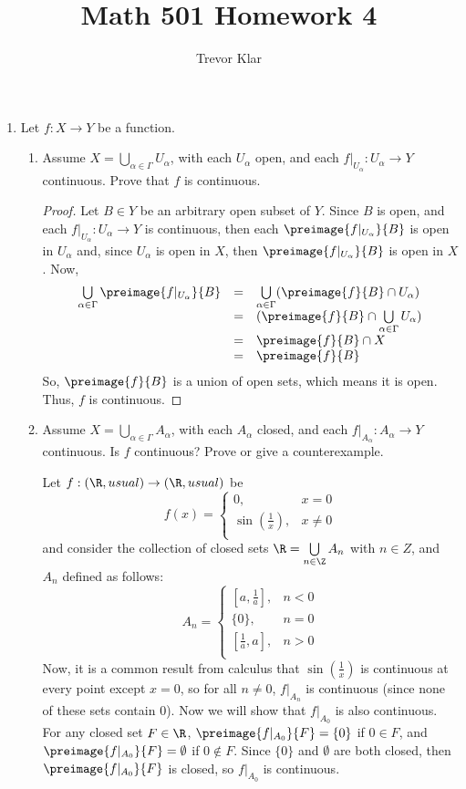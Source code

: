 \documentclass[letterpaper]{article}
\title{Math 501 \linebreak
Homework 4}
\author{Trevor Klar}
\newcommand{\arbcup}[1]{\bigcup\limits_{\alpha\in\Gamma}#1_\alpha}
\begin{document}
\maketitle


\begin{enumerate}
\item Let $f:X\to Y$ be a function. 
	\begin{enumerate}
	\item Assume $X=\arbcup{U}$, with each $U_\alpha$ open, and each $f|_{U_\alpha}:U_\alpha\to Y$ continuous. Prove that $f$ is continuous. 
	\begin{proof}
	Let $B\in Y$ be an arbitrary open subset of $Y$. Since $B$ is open, and each $f|_{U_\alpha}:U_\alpha\to Y$ is continuous, then each $\preimage{f|_{U_\alpha}}{B}$ is open in $U_\alpha$ and, since $U_\alpha$ is open in $X$, then $\preimage{f|_{U_\alpha}}{B}$ is open in $X$. Now, 
	\[
	\begin{array}{rcl}
	\bigcup\limits_{\alpha\in\Gamma}\preimage{f|_{U_\alpha}}{B}&=&\bigcup\limits_{\alpha\in\Gamma}(\preimage{f}{B}\cap U_\alpha)\\
	&=&(\preimage{f}{B}\cap \bigcup\limits_{\alpha\in\Gamma} U_\alpha)\\
	&=&\preimage{f}{B}\cap X\\
	&=&\preimage{f}{B}\\
	
	\end{array}
	\]
	So, $\preimage{f}{B}$ is a union of open sets, which means it is open. Thus, $f$ is continuous.  
	\end{proof}
	\item Assume $X=\arbcup{A}$, with each $A_\alpha$ closed, and each $f|_{A_\alpha}:A_\alpha\to Y$ continuous. Is $f$ continuous? Prove or give a counterexample. 
	\begin{counterexample*}
	Let $f:(\R,usual)\to(\R,usual)$ be 
	$$f(x)=
	\begin{cases}
	0, & x=0\\
	\sin\left(\frac{1}{x}\right), & x\neq0\\
	\end{cases}
	$$
	and consider the collection of closed sets $\R=\bigcup\limits_{n\in\Z}A_n$ with $n\in Z$, and $A_n$ defined as follows:
	$$
	A_n=
	\begin{cases}
	\left[a,\tfrac{1}{a}\right], & n<0\\
	\{0\}, & n=0\\
	\left[\tfrac{1}{a},a\right], & n>0\\
	\end{cases}
	$$
	Now, it is a common result from calculus that $\sin(\frac{1}{x})$ is continuous at every point except $x=0$, so for all $n\neq0$, $f|_{A_n}$ is continuous (since none of these sets contain 0). Now we will show that $f|_{A_0}$ is also continuous. For any closed set $F\in \R$, $\preimage{f|_{A_0}}{F}=\{0\}$ if $0\in F$, and $\preimage{f|_{A_0}}{F}=\emptyset$ if $0\not\in F$. Since $\{0\}$ and $\emptyset$ are both closed, then $\preimage{f|_{A_0}}{F}$ is closed, so $f|_{A_0}$ is continuous.
	

\end{counterexample*}
\end{enumerate}
\end{enumerate}
\end{document}
